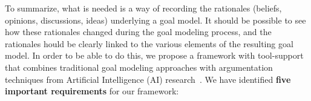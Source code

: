 


To summarize, what is needed is a way of recording the rationales (beliefs, opinions, discussions, ideas) underlying a goal model. It should be possible to see how these rationales changed during the goal modeling process, and the rationales hould be clearly linked to the various elements of the resulting goal model. In order to be able to do this, we propose a framework with tool-support that combines traditional goal modeling approaches with argumentation techniques from Artificial Intelligence (AI) research~\cite{BenchCaponDunne2007}. We have identified \textbf{five important requirements} for our framework: 

